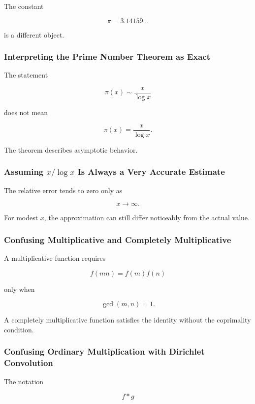 The constant

\[ \pi=3.14159\ldots \]

is a different object.

\subsubsection{Interpreting the Prime Number Theorem as Exact}

The statement

\[ \pi(x)\sim\frac{x}{\log x} \]

does not mean

\[ \pi(x)=\frac{x}{\log x}. \]

The theorem describes asymptotic behavior.

\subsubsection{Assuming \(x/\log x\) Is Always a Very Accurate Estimate}

The relative error tends to zero only as

\[ x\to\infty. \]

For modest \(x\), the approximation can still differ noticeably from the
actual value.

\subsubsection{Confusing Multiplicative and Completely Multiplicative}

A multiplicative function requires

\[ f(mn)=f(m)f(n) \]

only when

\[ \gcd(m,n)=1. \]

A completely multiplicative function satisfies the identity without the
coprimality condition.

\subsubsection{Confusing Ordinary Multiplication with Dirichlet Convolution}

The notation

\[ f*g \]

